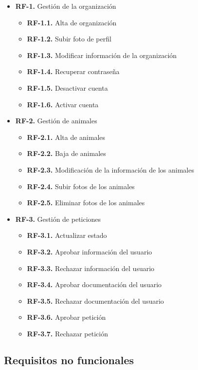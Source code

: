 \begin{itemize}
    \item \textbf{RF-1.} Gestión de la organización
    \begin{itemize}
        \item \textbf{RF-1.1.} Alta de organización
        \item \textbf{RF-1.2.} Subir foto de perfil
        \item \textbf{RF-1.3.} Modificar información de la organización
        \item \textbf{RF-1.4.} Recuperar contraseña
        \item \textbf{RF-1.5.} Desactivar cuenta
        \item \textbf{RF-1.6.} Activar cuenta
    \end{itemize}
    \item \textbf{RF-2.} Gestión de animales
    \begin{itemize}
        \item \textbf{RF-2.1.} Alta de animales
        \item \textbf{RF-2.2.} Baja de animales
        \item \textbf{RF-2.3.} Modificación de la información de los animales
        \item \textbf{RF-2.4.} Subir fotos de los animales
        \item \textbf{RF-2.5.} Eliminar fotos de los animales
    \end{itemize}
    \item \textbf{RF-3.} Gestión de peticiones
    \begin{itemize}
        \item \textbf{RF-3.1.} Actualizar estado
        \item \textbf{RF-3.2.} Aprobar información del usuario
        \item \textbf{RF-3.3.} Rechazar información del usuario
        \item \textbf{RF-3.4.} Aprobar documentación del usuario
        \item \textbf{RF-3.5.} Rechazar documentación del usuario
        \item \textbf{RF-3.6.} Aprobar petición
        \item \textbf{RF-3.7.} Rechazar petición
    \end{itemize}
\end{itemize}

\subsection{Requisitos no funcionales}\label{subsec:requisitos-no-funcionales}

